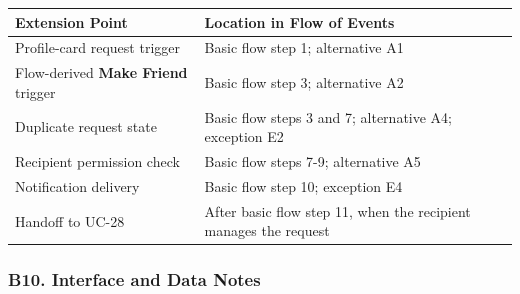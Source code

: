 \documentclass[12pt]{article}
\renewcommand{\baselinestretch}{1.5}
\begin{document}
\begingroup
\small
\renewcommand{\baselinestretch}{1.0}\selectfont
\renewcommand{\arraystretch}{1.15}
\setlength{\tabcolsep}{6pt}
\begin{longtable}{|>{\raggedright\arraybackslash}p{}|>{\raggedright\arraybackslash}p{}|}
\hline
\textbf{Extension Point} & \textbf{Location in Flow of Events} \\ \hline
\endhead
Profile-card request trigger & Basic flow step 1; alternative A1 \\ \hline
Flow-derived \textbf{Make Friend} trigger & Basic flow step 3; alternative A2 \\ \hline
Duplicate request state & Basic flow steps 3 and 7; alternative A4; exception E2 \\ \hline
Recipient permission check & Basic flow steps 7-9; alternative A5 \\ \hline
Notification delivery & Basic flow step 10; exception E4 \\ \hline
Handoff to UC-28 & After basic flow step 11, when the recipient manages the request \\ \hline
\end{longtable}
\endgroup
\par\medskip

\hypertarget{sec:b10-interface-and-data-notes}{}
\subsubsection*{B10. Interface and Data Notes}
\par\medskip
\end{document}
